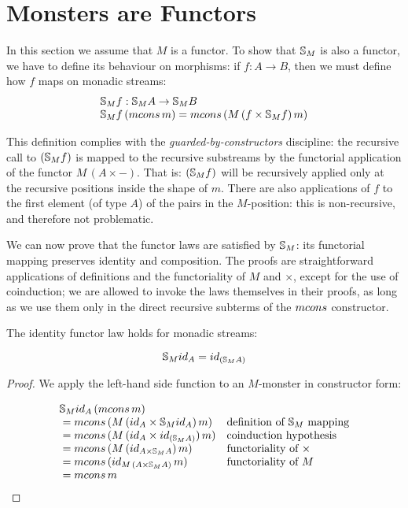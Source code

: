 \section{Monsters are Functors}\label{sec:functor}

In this section we assume that $M$ is a functor.
To show that $\mathbb{S}_{M}$ is also a functor, we have to define its behaviour on morphisms: if $f:A\rightarrow B$, then we must define how $f$ maps on monadic streams:
$$
\begin{array}{l}
\stream{M} f : \stream{M} A \rightarrow \stream{M} B\\
\stream{M} f\,(\mcons\,m) = \mcons\,(M\,(f\times \stream{M} f)\,m)
\end{array}
$$

This definition complies with the {\em guarded-by-constructors} discipline: the recursive call to $(\mathbb{S}_{M} f)$ is mapped to the recursive substreams by the functorial application of the functor $M\,(A \times -)$.
That is: $(\mathbb{S}_{M} f)$ will be recursively applied only at the recursive positions inside the shape of $m$.
There are also applications of $f$ to the first element (of type $A$) of the pairs in the $M$-position: this is non-recursive, and therefore not problematic.


We can now prove that the functor laws are satisfied by $\mathbb{S}_{M}$: its functorial mapping preserves identity and composition.
The proofs are straightforward applications of definitions and the functoriality of $M$ and $\times$, except for the use of coinduction;
we are allowed to invoke the laws themselves in their proofs, as long as we use them only in the direct recursive subterms of the $\mcons$ constructor.

\begin{lemma}\label{lemma:functor_id}
The identity functor law holds for monadic streams:

$$
\stream{M} \id_A = \id_{(\stream{M} A)}
$$

\end{lemma}
\begin{proof}
We apply the left-hand side function to an $M$-monster in constructor form:

$$
\begin{array}{ll}
\stream{M} \id_A\,(\mcons\,m)\\
{}= \mcons\,(M\,(\id_A\times \stream{M} \id_A)\,m)
  & \mbox{definition of }\stream{M}\mbox{ mapping}\\
{}= \mcons\,(M\,(\id_A\times \id_{(\stream{M} A)})\,m)
  & \mbox{coinduction hypothesis}\\
{}= \mcons\,(M\,(\id_{A\times \stream{M} A})\,m)
  & \mbox{functoriality of }\times\\
{}= \mcons\,(\id_{M\,(A\times \stream{M} A)}\,m)
  & \mbox{functoriality of }M\\
{}= \mcons\,m
\end{array}
$$

\end{proof}

